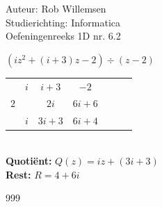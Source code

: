 \documentclass[a4paper]{article}
\begin{document}
\noindent \large Auteur: Rob Willemsen \\
\noindent \large Studierichting: Informatica\\
\noindent \large Oefeningenreeks 1D nr. 6.2\\

\medskip

\normalsize

$(iz^2 + (i+3)z-2) \div (z-2)$ \\

\begin{tabular}{c|cccccc}
    & $i$ & $i+3$  & $-2$ \\
$2$ &     & $2i$   & $6i+6$ \\ \hline
    & $i$ & $3i+3$ & \vline $6i+4$ \\
\end{tabular}\\

\textbf{Quotiënt:} $Q(z) = iz + (3i + 3)$ \\

\textbf{Rest:} $R = 4 + 6i$ \\

\begin{thebibliography}{999}
\end{thebibliography}
\end{document}
